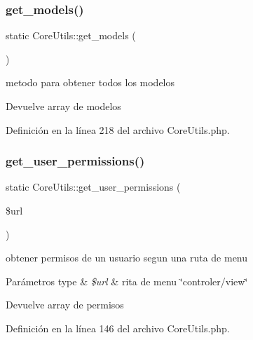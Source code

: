 \subsubsection{\texorpdfstring{get\_models()}{get\_models()}}
{\footnotesize\ttfamily static Core\+Utils\+::get\+\_\+models (\begin{DoxyParamCaption}{ }\end{DoxyParamCaption})\hspace{0.3cm}{\ttfamily [static]}}

metodo para obtener todos los modelos

\begin{DoxyReturn}{Devuelve}
array de modelos 
\end{DoxyReturn}


Definición en la línea 218 del archivo Core\+Utils.\+php.

\mbox{\label{class_core_utils_ae5603ae99ba9ffe573bca46e834e3c23}} 
\subsubsection{\texorpdfstring{get\_user\_permissions()}{get\_user\_permissions()}}
{\footnotesize\ttfamily static Core\+Utils\+::get\+\_\+user\+\_\+permissions (\begin{DoxyParamCaption}\item[{}]{\$url }\end{DoxyParamCaption})\hspace{0.3cm}{\ttfamily [static]}}

obtener permisos de un usuario segun una ruta de menu


\begin{DoxyParams}[1]{Parámetros}
type & {\em \$url} & rita de menu \char`\"{}controler/view\char`\"{} \\
\hline
\end{DoxyParams}
\begin{DoxyReturn}{Devuelve}
array de permisos 
\end{DoxyReturn}


Definición en la línea 146 del archivo Core\+Utils.\+php.

\mbox{\label{class_core_utils_a10d5b2d56fd4d1109e8de78c5facaa7c}} 
